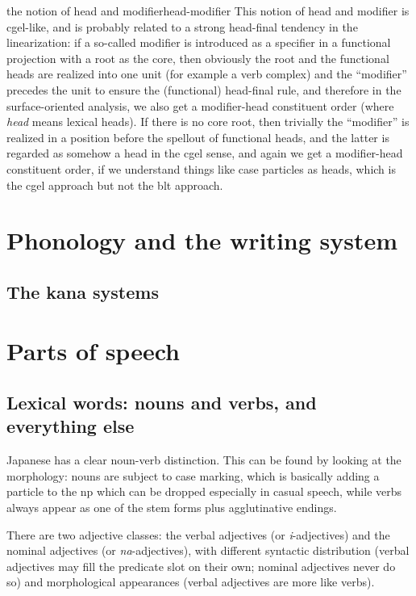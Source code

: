 \documentclass[UTF8, a4paper, oneside, scheme=plain]{ctexrep}
\newcommand*{\term}[1]{\emph{#1}}
\newcommand{\corpus}[1]{\emph{#1}}
\begin{document}
\begin{theorybox}{the notion of head and modifier}{head-modifier}
    This notion of head and modifier is \acs{cgel}-like, 
    and is probably related to a strong head-final tendency in the linearization:
    if a so-called modifier is introduced as a specifier 
    in a functional projection with a root as the core,
    then obviously the root and the functional heads are realized into one unit (for example a verb complex) 
    and the ``modifier'' precedes the unit to ensure the (functional) head-final rule,
    and therefore in the surface-oriented analysis,
    we also get a modifier-head constituent order (where \term{head} means lexical heads).
    If there is no core root,
    then trivially the ``modifier'' is realized in a position before the spellout of functional heads,
    and the latter is regarded as somehow a head in the \acs{cgel} sense,
    and again we get a modifier-head constituent order,
    if we understand things like case particles as heads,
    which is the \ac{cgel} approach but not the \acs{blt} approach.
\end{theorybox}

\section{Phonology and the writing system}

\subsection{The kana systems}



\section{Parts of speech}

\subsection{Lexical words: nouns and verbs, and everything else}

Japanese has a clear noun-verb distinction.
This can be found by looking at the morphology:
nouns are subject to case marking,
which is basically adding a particle to the \acs{np} 
which can be dropped especially in casual speech,
while verbs always appear as one of the stem forms plus agglutinative endings.

There are two adjective classes:
the verbal adjectives (or \corpus{i}-adjectives)
and the nominal adjectives (or \corpus{na}-adjectives),
with different syntactic distribution 
(verbal adjectives may fill the predicate slot on their own; nominal adjectives never do so)
and morphological appearances
(verbal adjectives are more like verbs).
\end{document}
